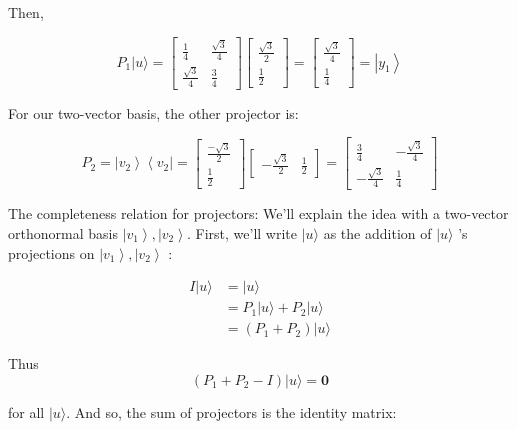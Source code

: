 \documentclass[main.tex]{subfiles}
\begin{document}
    Then,
    
    $$
    P_{1}|u\rangle=\left[\begin{array}{cc}
    \frac{1}{4} & \frac{\sqrt{3}}{4} \\
    \frac{\sqrt{3}}{4} & \frac{3}{4}
    \end{array}\right]\left[\begin{array}{c}
    \frac{\sqrt{3}}{2} \\
    \frac{1}{2}
    \end{array}\right]=\left[\begin{array}{c}
    \frac{\sqrt{3}}{4} \\
    \frac{1}{4}
    \end{array}\right]=\left|y_{1}\right\rangle
    $$
    
    For our two-vector basis, the other projector is:
    
    $$
    P_{2}=\left|v_{2}\right\rangle\left\langle v_{2}\right|=\left[\begin{array}{c}
    \frac{-\sqrt{3}}{2} \\
    \frac{1}{2}
    \end{array}\right]\left[\begin{array}{ll}
    -\frac{\sqrt{3}}{2} & \frac{1}{2}
    \end{array}\right]=\left[\begin{array}{cc}
    \frac{3}{4} & -\frac{\sqrt{3}}{4} \\
    -\frac{\sqrt{3}}{4} & \frac{1}{4}
    \end{array}\right]
    $$
    
    The completeness relation for projectors: We'll explain the idea with a two-vector orthonormal basis $\left|v_{1}\right\rangle,\left|v_{2}\right\rangle$. First, we'll write $|u\rangle$ as the addition of $|u\rangle$ 's projections on $\left|v_{1}\right\rangle,\left|v_{2}\right\rangle$ :
    
    $$
    \begin{aligned}
    I|u\rangle &=|u\rangle \\
    &=P_{1}|u\rangle+P_{2}|u\rangle \\
    &=\left(P_{1}+P_{2}\right)|u\rangle
    \end{aligned}
    $$
    
    Thus
    $$
    \left(P_{1}+P_{2}-I\right)|u\rangle=\mathbf{0}
    $$
    
    for all $|u\rangle$. And so, the sum of projectors is the identity matrix:
    
\end{document}

